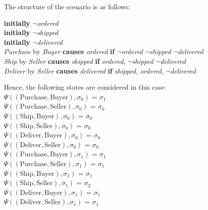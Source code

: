 \documentclass[a4paper]{article}
\begin{document}
The structure of the scenario is as follows:
\begin{center}
\textbf{initially} $\neg$\textit{ordered} \\[0.1\baselineskip]
\textbf{initially} $\neg$\textit{shipped} \\[0.1\baselineskip]
\textbf{initially} $\neg$\textit{delivered} \\[0.1\baselineskip]
\textit{Purchase} by \textit{Buyer} \textbf{causes} \textit{ordered} \textbf{if} $\neg$\textit{ordered} $\neg$\textit{shipped} $\neg$\textit{delivered}\\[0.1\baselineskip]
\textit{Ship} by \textit{Seller} \textbf{causes} \textit{shipped} \textbf{if} \textit{ordered}, $\neg$\textit{shipped} $\neg$\textit{delivered}\\[0.1\baselineskip]
\textit{Deliver} by \textit{Seller} \textbf{causes} \textit{delivered} \textbf{if} \textit{shipped}, \textit{ordered}, $\neg$\textit{delivered} \\[0.5\baselineskip]
\end{center}
Hence, the following states are considered in this case: \\[0.5\baselineskip] 
$\Psi((\text{Purchase},\text{Buyer}),\sigma_0)$ = $\sigma_1$ \\[0.1\baselineskip] 
$\Psi((\text{Purchase},\text{Seller}),\sigma_0)$ = $\sigma_0$ \\[0.1\baselineskip] 
$\Psi((\text{Ship},\text{Buyer}),\sigma_0)$ = $\sigma_0$ \\[0.1\baselineskip] 
$\Psi((\text{Ship},\text{Seller}),\sigma_0)$ = $\sigma_0$ \\[0.1\baselineskip] 
$\Psi((\text{Deliver}, \text{Buyer}),\sigma_0)$ = $\sigma_0$ \\[0.1\baselineskip]
$\Psi((\text{Deliver}, \text{Seller}),\sigma_0)$ = $\sigma_0$ \\[0.7\baselineskip]
$\Psi((\text{Purchase},\text{Buyer}),\sigma_1)$ = $\sigma_1$ \\[0.1\baselineskip] 
$\Psi((\text{Purchase},\text{Seller}),\sigma_1)$ = $\sigma_1$ \\[0.1\baselineskip] 
$\Psi((\text{Ship},\text{Buyer}),\sigma_1)$ = $\sigma_1$ \\[0.1\baselineskip] 
$\Psi((\text{Ship},\text{Seller}),\sigma_1)$ = $\sigma_2$ \\[0.1\baselineskip] 
$\Psi((\text{Deliver},\text{Buyer}),\sigma_1)$ = $\sigma_1$ \\[0.1\baselineskip] 
$\Psi((\text{Deliver},\text{Seller}),\sigma_1)$ = $\sigma_1$ \\[0.7\baselineskip] 
\end{document}
